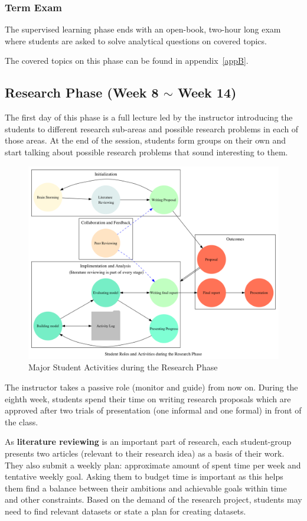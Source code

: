 \documentclass{article}
\begin{document}
\subsubsection{Term Exam} 
The supervised learning phase ends with an open-book, two-hour long exam where students are asked to solve analytical questions on covered topics.
\par The covered topics on this phase can be found in appendix~\ref{appB}. 
\subsection{Research Phase (Week 8 $\sim$ Week 14)}
The first day of this phase is a full lecture led by the instructor introducing the students to different research sub-areas and possible research problems in each of those areas. At the end of the session, students form groups on their own and start talking about possible research problems that sound interesting to them.
\begin{figure}[h]
\centering
\includegraphics[width=.75\textwidth]{./figures/graph3}
\caption{Major Student Activities during the Research Phase} \label{fig2}
\end{figure}
\par The instructor takes a passive role (monitor and guide) from now on. During the eighth week, students spend their time on writing research proposals which are approved after two trials of presentation (one informal and one formal) in front of the class. 
\par As {\bf literature reviewing} is an important part of research, each student-group presents two articles (relevant to their research idea) as a basis of their work. They also submit a weekly plan: approximate amount of spent time per week and tentative weekly goal. Asking them to budget time is important as this helps them find a balance between their ambitions and achievable goals within time and other constraints. Based on the demand of the research project, students may need to find relevant datasets or state a plan for creating datasets. 
\end{document}
